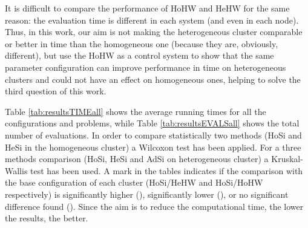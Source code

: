 \documentclass[final,1p,times]{elsarticle}
\begin{document}
It is difficult to compare the performance of HoHW and HeHW
for the same reason: the evaluation time is different in each system
(and even in each node). Thus, in this work, our aim is not making the
heterogeneous cluster comparable or better in time than the
homogeneous one (because they are, obviously, different), but use the HoHW as a control system to show
that the same parameter configuration can improve performance in time
on heterogeneous clusters and could not have an effect on homogeneous
ones, helping to solve the third question of this work.






Table \ref{tab:resultsTIMEall} shows the average running times for
all the configurations and problems, while Table
\ref{tab:resultsEVALSall} shows the total number of evaluations. In
order to compare statistically  two methods (HoSi and HeSi in the
homogeneous cluster) a Wilcoxon test has been applied. For a three
methods comparison (HoSi, HeSi and AdSi on heterogeneous cluster) a
Kruskal-Wallis test has been used. A mark in the tables indicates if
the comparison with the base configuration of each cluster (HoSi/HeHW
and HoSi/HoHW respectively) is significantly higher (),
significantly lower  (), or no significant difference found
(). Since the aim is to reduce the computational time, the
lower the results, the better. 
\end{document}
